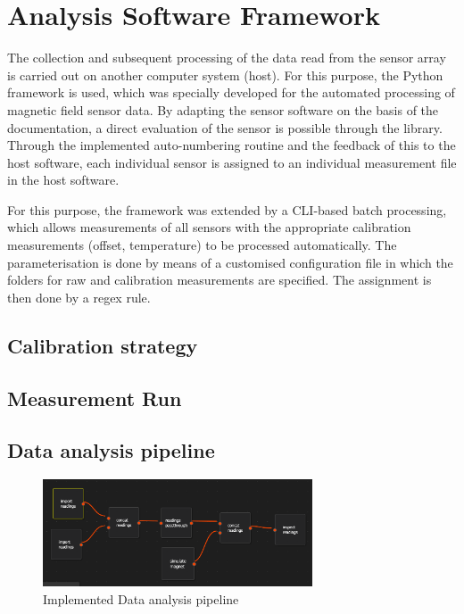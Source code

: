 \documentclass[conference]{IEEEtran}
\begin{document}
\section{Analysis Software Framework}

The collection and subsequent processing of the data read from the sensor array is carried out on another computer system (host).
For this purpose, the Python framework is used, which was specially developed for the automated processing of magnetic field sensor data.
By adapting the sensor software on the basis of the documentation, a direct evaluation of the sensor is possible through the library.
Through the implemented auto-numbering routine and the feedback of this to the host software, each individual sensor is assigned to an individual measurement file in the host software.

For this purpose, the framework was extended by a CLI-based batch processing, which allows measurements of all sensors with the appropriate calibration measurements (offset, temperature) to be processed automatically.
The parameterisation is done by means of a customised configuration file in which the folders for raw and calibration measurements are specified.
The assignment is then done by a regex rule.


\subsection{Calibration strategy \label{ref_calib}}



\subsection{Measurement Run}


\subsection{Data analysis pipeline}


\begin{figure}[htbp]
\centerline{\includegraphics[width=8cm]{dataprocessing_pipeline.png}}
\caption{Implemented Data analysis pipeline}
\label{dataprocessing_pipeline_fig}
\end{figure}
\end{document}
